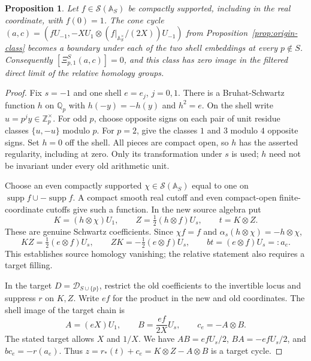 \documentclass[11pt,letterpaper]{article}
\newtheorem{proposition}[theorem]{Proposition}
\theoremstyle{definition}
\theoremstyle{remark}
\newcommand{\Q}{\mathbb Q}
\newcommand{\Z}{\mathbb Z}
\newcommand{\Sch}{\mathcal S}
\newcommand{\supp}{\operatorname{supp}}
\begin{document}
\begin{proposition}\label{prop:origin-killed}
Let $f\in\Sch(\mathbb A_S)$ be compactly supported, including
in the real coordinate, with $f(0)=1$. The cone cycle
$(a,c)=(fU_{-1},-XU_1\otimes(f|_{\mathbb A_S^\times}/(2X))U_{-1})$
from Proposition~\ref{prop:origin-class} becomes a boundary
under each of the two shell embeddings at every $p\notin S$.
Consequently $[\Xi_{p,1}^S(a,c)]=0$, and this class has zero
image in the filtered direct limit of the relative homology groups.
\end{proposition}
\begin{proof}
Fix $s=-1$ and one shell $e=e_j$, $j=0,1$. There is a
Bruhat-Schwartz function $h$ on $\Q_p$ with
$h(-y)=-h(y)$ and $h^2=e$. On the shell write
$u=p^jy\in\Z_p^\times$. For odd $p$, choose opposite signs
on each pair of unit residue classes $\{u,-u\}$ modulo $p$.
For $p=2$, give the classes $1$ and $3$ modulo $4$ opposite
signs. Set $h=0$ off the shell. All pieces are compact open,
so $h$ has the asserted regularity, including at zero.
Only its transformation under $s$ is used; $h$ need not be
invariant under every old arithmetic unit.

Choose an even compactly supported $\chi\in\Sch(\mathbb A_S)$
equal to one on $\supp f\cup-\supp f$. A compact smooth real
cutoff and even compact-open finite-coordinate cutoffs give
such a function. In the new source algebra put
\begin{equation}
 K=(h\otimes\chi)U_1,\qquad
 Z=\tfrac12(h\otimes f)U_s,\qquad t=K\otimes Z.
 \label{eq:source-shell-filling}
\end{equation}
These are genuine Schwartz coefficients. Since $\chi f=f$
and $\alpha_s(h\otimes\chi)=-h\otimes\chi$,
\begin{equation}
 KZ=\tfrac12(e\otimes f)U_s,\qquad
 ZK=-\tfrac12(e\otimes f)U_s,\qquad
 bt=(e\otimes f)U_s=:a_e.
 \label{eq:shell-commutator}
\end{equation}
This establishes source homology vanishing; the relative
statement also requires a target filling.

In the target $D=\mathscr D_{S\cup\{p\}}$, restrict the old
coefficients to the invertible locus and suppress $r$ on
$K,Z$. Write $ef$ for the product in the new and old coordinates.
The shell image of the target chain is
\begin{equation}
 A=(eX)U_1,\qquad B=\frac{ef}{2X}U_s,\qquad c_e=-A\otimes B.
 \label{eq:target-shell-cycle}
\end{equation}
The stated target allows $X$ and $1/X$. We have
$AB=efU_s/2$, $BA=-efU_s/2$, and $bc_e=-r(a_e)$.
Thus $z=r_*(t)+c_e=K\otimes Z-A\otimes B$ is a target cycle.


\end{proof}
\end{document}
